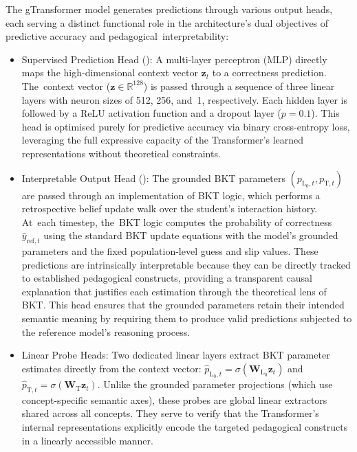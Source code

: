 \documentclass[applsci,article,accept,moreauthors,pdftex]{Definitions/mdpi}
\begin{document}
The gTransformer model generates predictions through various output heads, each serving a distinct functional role in the architecture's dual objectives of predictive accuracy and pedagogical~interpretability:
\begin{itemize}
    \item Supervised Prediction Head (): {A multi-layer perceptron (MLP) directly maps the high-dimensional context vector $\mathbf{z}_t$ to a correctness prediction. The~context vector ($\mathbf{z} \in \mathbb{R}^{128}$) is passed through a sequence of three linear layers with neuron sizes of 512, 256, and~1, respectively. Each hidden layer is followed by a ReLU activation function and a dropout layer ($p=0.1$).} This head is optimised purely for predictive accuracy via binary cross-entropy loss, leveraging the full expressive capacity of the Transformer's learned representations without theoretical constraints.
    \item Interpretable Output Head (): The grounded BKT parameters $(p_{\text{L}_0,t}, p_{\text{T},t})$ are passed through an implementation of BKT logic, which performs a retrospective belief update walk over the student's interaction history. At~each timestep, the~BKT logic computes the probability of correctness $\hat{y}_{\text{ref},t}$ using the standard BKT update equations with the model's grounded parameters and the fixed population-level guess and slip values. These predictions are intrinsically interpretable because they can be directly tracked to established pedagogical constructs, providing a transparent causal explanation that justifies each estimation through the theoretical lens of BKT. This head ensures that the grounded parameters retain their intended semantic meaning by requiring them to produce valid predictions subjected to the reference model's reasoning process.
    \item Linear Probe Heads: Two dedicated linear layers extract BKT parameter estimates directly from the context vector: $\hat{p}_{\text{L}_0,t} = \sigma(\mathbf{W}_{\text{L}_0} \mathbf{z}_t)$ and $\hat{p}_{\text{T},t} = \sigma(\mathbf{W}_{\text{T}} \mathbf{z}_t)$. Unlike the grounded parameter projections (which use concept-specific semantic axes), these probes are global linear extractors shared across all concepts. They serve to verify that the Transformer's internal representations explicitly encode the targeted pedagogical constructs in a linearly accessible manner.
\end{itemize}
\end{document}
